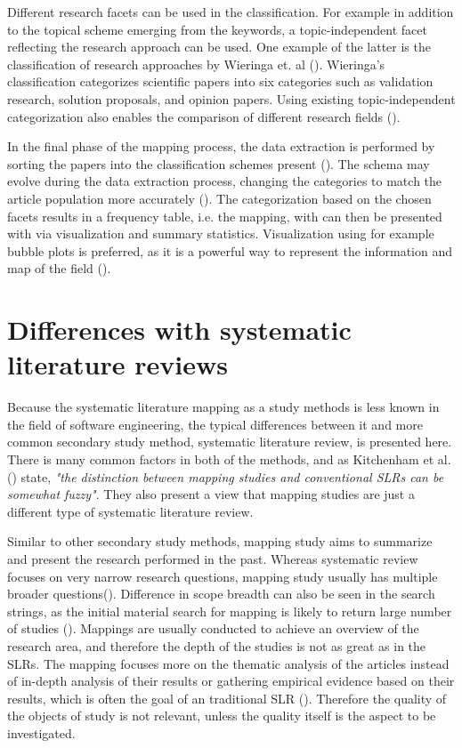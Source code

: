 \documentclass[utf8,english]{gradu3}
\begin{document}
Different research facets can be used in the classification. For example in
addition to the topical scheme emerging from the keywords, a topic-independent
facet reflecting the research approach can be used. One example of the latter is
the classification of research approaches by Wieringa et. al
(\cite*{wieringa2006}). Wieringa's classification categorizes scientific papers
into six categories such as validation research, solution proposals, and opinion
papers. Using existing topic-independent categorization also enables the
comparison of  different research fields (\cite{petersen2015}).

In the final phase of the mapping process, the data extraction is performed by
sorting the papers into the classification schemes present
(\cite{petersen2008}). The schema may evolve during the data extraction process,
changing the categories to match the article population more accurately
(\cite{petersen2015}). The categorization based on the chosen facets results in
a frequency table, i.e. the mapping, with can then be presented with via
visualization and summary statistics. Visualization using for example bubble
plots is preferred, as it is a powerful way to represent the information and map
of the field (\cite{petersen2008}).


\section{Differences with systematic literature reviews}

Because the systematic literature mapping as a study methods is less known in
the field of software engineering, the typical differences between it and more
common secondary study method, systematic literature review, is presented here.
There is many common factors in both of the methods, and as Kitchenham et al.
(\cite{kitchenham2010}) state, \textit{"the distinction between mapping studies
and conventional SLRs can be somewhat fuzzy"}. They also present a view that
mapping studies are just a different type of systematic literature review.

Similar to other secondary study methods, mapping study aims to summarize and
present the research performed in the past. Whereas systematic review focuses on
very narrow research questions, mapping study usually has multiple broader
questions(\cite{kitchenham2010}). Difference in scope breadth can also be seen
in the search strings, as the initial material search for mapping is likely to
return large number of studies (\cite{kitchenham2007, petersen2008}). Mappings
are usually conducted to achieve an overview of the research area, and therefore
the depth of the studies is not as great as in the SLRs. The mapping focuses
more on the thematic analysis of the articles instead of in-depth analysis of
their results or gathering empirical evidence based on their results, which is
often the goal of an traditional SLR (\cite{petersen2008}). Therefore the
quality of the objects of study is not relevant, unless the quality itself is
the aspect to be investigated.
\end{document}
